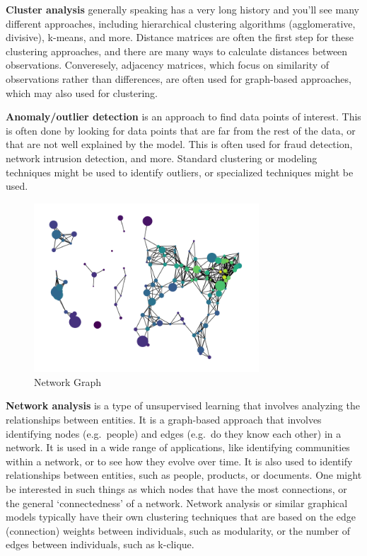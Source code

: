 \documentclass[
  letterpaper,
]{krantz}
\begin{document}
\textbf{Cluster analysis} generally speaking has a very long history and
you'll see many different approaches, including hierarchical clustering
algorithms (agglomerative, divisive), k-means, and more. Distance
matrices are often the first step for these clustering approaches, and
there are many ways to calculate distances between observations.
Converesely, adjacency matrices, which focus on similarity of
observations rather than differences, are often used for graph-based
approaches, which may also used for clustering.

\textbf{Anomaly/outlier detection} is an approach to find data points of
interest. This is often done by looking for data points that are far
from the rest of the data, or that are not well explained by the model.
This is often used for fraud detection, network intrusion detection, and
more. Standard clustering or modeling techniques might be used to
identify outliers, or specialized techniques might be used.

\begin{figure}

{\centering \includegraphics[width=0.75\textwidth,height=\textheight]{img/network_us.png}

}

\caption{\label{fig-network-graph}Network Graph}

\end{figure}

\textbf{Network analysis} is a type of unsupervised learning that
involves analyzing the relationships between entities. It is a
graph-based approach that involves identifying nodes (e.g.~people) and
edges (e.g.~do they know each other) in a network. It is used in a wide
range of applications, like identifying communities within a network, or
to see how they evolve over time. It is also used to identify
relationships between entities, such as people, products, or documents.
One might be interested in such things as which nodes that have the most
connections, or the general `connectedness' of a network. Network
analysis or similar graphical models typically have their own clustering
techniques that are based on the edge (connection) weights between
individuals, such as modularity, or the number of edges between
individuals, such as k-clique.
\end{document}
